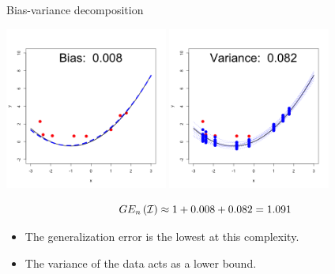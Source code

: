 \documentclass[11pt,compress,t,notes=noshow, xcolor=table]{beamer}
\begin{document}
\begin{vbframe} {Bias-variance decomposition}
\framebreak

\begin{center}
  \includegraphics[width = 0.4\textwidth]{figure/bias_variance_decomposition-correct_model_bias.png}
  \includegraphics[width = 0.4\textwidth]{figure/bias_variance_decomposition-correct_model_variance.png}
\end{center}

$$GE_n\left(\mathcal{I}\right) \approx 1 + 0.008 + 0.082 = 1.091 $$

\begin{itemize}
  \item The generalization error is the lowest at this complexity.
  \item The variance of the data acts as a lower bound.
\end{itemize}
 

\end{vbframe}
\end{document}
